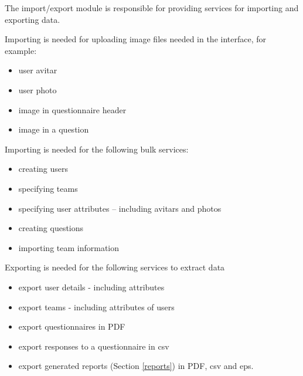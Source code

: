 The import/export module is responsible for providing services for importing and exporting data. 

Importing is needed for uploading image files needed in the interface, for example:
\begin{itemize}
\item user avitar
\item user photo
\item image in questionnaire header
\item image in a question
\end{itemize}

Importing is needed for the following bulk services:
\begin{itemize}
\item creating users
\item specifying teams
\item specifying user attributes -- including avitars and photos
\item creating questions
\item importing team information
\end{itemize}

Exporting is needed for the following services to extract data
\begin{itemize}
\item export user details - including attributes
\item export teams - including attributes of users
\item export questionnaires in PDF
\item export responses to a questionnaire in csv
\item export generated reports (Section \ref{reports}) in PDF, csv and eps.
\end{itemize}
